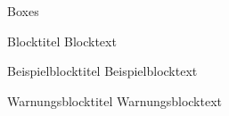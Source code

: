 \begin{frame}{Boxes}
        \begin{block}{Blocktitel}
                Blocktext
        \end{block}
        \begin{exampleblock}{Beispielblocktitel}
                Beispielblocktext
        \end{exampleblock}
        \begin{alertblock}{Warnungsblocktitel}
                Warnungsblocktext
        \end{alertblock}
\end{frame}
